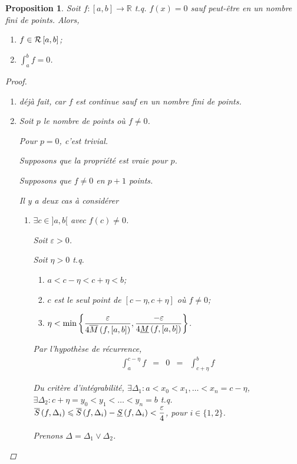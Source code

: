 \documentclass{report}
\newcommand*{\dint}[3]{\displaystyle\int_{#1}^{#2}#3}
\newcommand*{\raffinement}[2]{#1 \vee #2}
\newcommand*{\eps}{\varepsilon}
\newcommand*{\lte}{\leqslant}
\newcommand*{\reels}{\mathbb{R}}
\newtheorem*{prop}{Proposition}
\theoremstyle{definition}
\theoremstyle{remark}
\begin{document}
	\begin{prop}
		Soit $f:[a,b] \to \reels$ t.q. $f(x)=0$ sauf peut-\^etre en un nombre fini de points. Alors,
		\begin{enumerate}[label=\alph*)]
			\item $f \in \riemann$;
			\item $\dint{a}{b}{f}=0$.
		\end{enumerate}
		\begin{proof}~

			\begin{enumerate}[label=\alph*)]
				\item d\'ej\`a fait, car $f$ est continue sauf en un nombre fini de points.
				\item Soit $p$ le nombre de points o\`u $f \neq 0$.

				Pour $p=0$, c'est trivial.

				Supposons que la propri\'et\'e est vraie pour $p$.

				Supposons que $f \neq 0$ en $p+1$ points.

				Il y a deux cas \`a consid\'erer
				\begin{enumerate}[label=\arabic*)]
					\item $\exists c \in ]a,b[$ avec $f(c) \neq 0$.

					Soit $\eps>0$.

					Soit $\eta>0$ t.q.
					\begin{enumerate}[label=\roman*)]
						\item $a<c-\eta<c+\eta<b$;
						\item $c$ est le seul point de $[c-\eta,c+\eta]$ o\`u $f\neq0$;
						\item $\eta<\min\left\lbrace \dfrac{\eps}{4\msup{f}}, \dfrac{-\eps}{4\minf{f}} \right\rbrace$.
					\end{enumerate}

					Par l'hypoth\`ese de r\'ecurrence,
					\[
					\begin{array}{rcccl}
						\displaystyle\int_{a}^{c-\eta}f&=&0&=&\displaystyle\int_{c+\eta}^{b}f
					\end{array}
					\]

					Du crit\`ere d'int\'egrabilit\'e, $\exists \Delta_1:a<x_0<x_1,\dotsc<x_n=c-\eta$, $\exists \Delta_2:c+\eta=y_0<y_1<\dotsc<y_n=b$ t.q. $\ssup{f}[\Delta_i] \lte \ssup{f}[\Delta_i]-\sinf{f}[\Delta_i]<\dfrac{\eps}{4}$, pour $i\in\{1,2\}$.

					Prenons $\Delta=\raffinement{\Delta_1}{\Delta_2}$.


\end{enumerate}
\end{enumerate}
\end{proof}
\end{prop}
\end{document}
